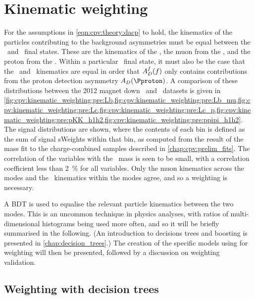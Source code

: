 \chapter{Kinematic weighting}
\label{chap:cpv:kinematic_weighting}

For the assumptions in \cref{eqn:cpv:theory:dacp} to hold, the
kinematics of the particles contributing to the background asymmetries must be 
equal between the \pKK\ and \ppipi\ final states.
These are the kinematics of the \PLambdab, the muon from the \PLambdab, and the 
proton from the \PLambdac.
Within a particular \phh\ final state, it must also be the case that the \Php\ 
and \Phm\ kinematics are equal in order that $A_{D}^{f}(f)$ only contains 
contributions from the proton detection asymmetry $\AD(\Pproton)$.
A comparison of these distributions between the 2012 magnet down \pKK\ and 
\ppipi\ datasets is given in 
\cref{fig:cpv:kinematic_weighting:pre:Lb,fig:cpv:kinematic_weighting:pre:Lb_mu,fig:cpv:kinematic_weighting:pre:Lc,fig:cpv:kinematic_weighting:pre:Lc_p,fig:cpv:kinematic_weighting:pre:pKK_h1h2,fig:cpv:kinematic_weighting:pre:ppipi_h1h2}.
The signal distributions are shown, where the contents of each bin is defined 
as the sum of signal sWeights within that bin, as computed from the result of 
the mass fit to the charge-combined samples described in 
\cref{chap:cpv:prelim_fits}.
The correlation of the variables with the \PLambdac\ mass is seen to be small, 
with a correlation coefficient less than \SI{2}{\percent} for all variables.
Only the muon kinematics across the modes and the \hmhp\ kinematics within the 
modes agree, and so a weighting is necessary.

A \acf{BDT} is used to equalise the relevant particle kinematics between the 
two modes.
This is an uncommon technique in physics analyses, with ratios of 
multi-dimensional histograms being used more often, and so it will be briefly 
summarised in the following.
(An introduction to decisions trees and boosting is presented in 
\cref{chap:decision_trees}.)
The creation of the specific models using for weighting will then be presented, 
followed by a discussion on weighting validation.

\section{Weighting with decision trees}
\label{chap:cpv:kinematic_weighting:bdt_method}

